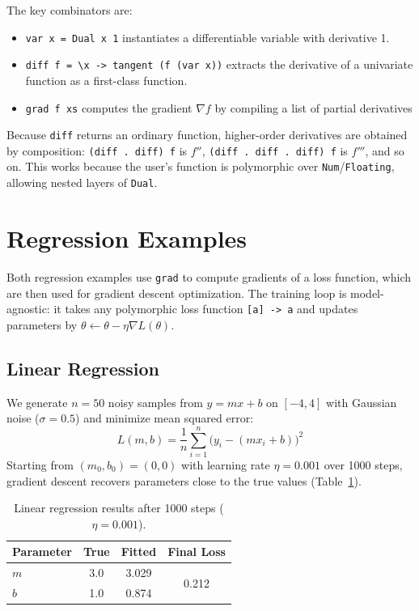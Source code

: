 \documentclass{article}
\begin{document}
The key combinators are:
\begin{itemize}
  \item \texttt{var x = Dual x 1} instantiates a differentiable variable with derivative 1.
  \item \texttt{diff f = \textbackslash x -> tangent (f (var x))} extracts the derivative of a univariate function as a first-class function.
  \item \texttt{grad f xs} computes the gradient $\nabla f$ by compiling a list of partial derivatives
\end{itemize}
Because \texttt{diff} returns an ordinary function, higher-order derivatives are obtained by composition: \texttt{(diff . diff) f} is $f''$, \texttt{(diff . diff . diff) f} is $f'''$, and so on. This works because the user's function is polymorphic over \texttt{Num}/\texttt{Floating}, allowing nested layers of \texttt{Dual}.

\section{Regression Examples}

Both regression examples use \texttt{grad} to compute gradients of a loss function, which are then used for gradient descent optimization. The training loop is model-agnostic: it takes any polymorphic loss function \texttt{[a] -> a} and updates parameters by $\theta \leftarrow \theta - \eta \nabla L(\theta)$.

\subsection{Linear Regression}

We generate $n = 50$ noisy samples from $y = mx + b$ on $[-4, 4]$ with Gaussian noise ($\sigma = 0.5$) and minimize mean squared error:
\[
L(m, b) = \frac{1}{n} \sum_{i=1}^{n} \bigl(y_i - (m x_i + b)\bigr)^2
\]
Starting from $(m_0, b_0) = (0, 0)$ with learning rate $\eta = 0.001$ over 1000 steps, gradient descent recovers parameters close to the true values (Table~\ref{tab:linear}).

\begin{table}[ht]
\centering
\begin{tabular}{lccc}
\hline
\textbf{Parameter} & \textbf{True} & \textbf{Fitted} & \textbf{Final Loss} \\
\hline
$m$ & 3.0 & 3.029 & \multirow{2}{*}{0.212} \\
$b$ & 1.0 & 0.874 & \\
\hline
\end{tabular}
\caption{Linear regression results after 1000 steps ($\eta = 0.001$).}
\label{tab:linear}
\end{table}
\end{document}

